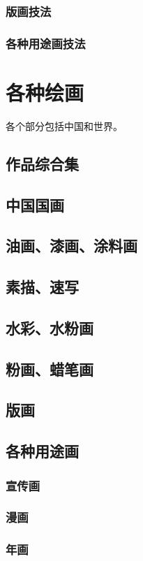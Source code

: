\documentclass[UTF8]{../RepresentationUniverse}
\begin{document}
    \subsubsection{版画技法}
    \subsubsection{各种用途画技法}

\section{各种绘画}
各个部分包括中国和世界。
    \subsection{作品综合集}
    \subsection{中国国画}
    \subsection{油画、漆画、涂料画}
    \subsection{素描、速写}
    \subsection{水彩、水粉画}
    \subsection{粉画、蜡笔画}
    \subsection{版画}
    \subsection{各种用途画}
        \subsubsection{宣传画}
        \subsubsection{漫画}
        \subsubsection{年画}
\end{document}
